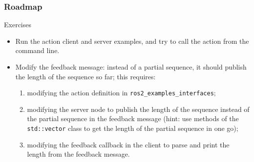 \documentclass[aspectratio=169]{beamer}
\begin{document}
\frame{\titlepage}



\begin{frame}
	\frametitle{Roadmap}
	\tableofcontents
\end{frame}







\begin{frame}{Exercises}
	\begin{itemize}
		\item Run the action client and server examples, and try to call the action from the command line.
		\item Modify the feedback message: instead of a partial sequence, it should publish the length of the sequence so far; this requires:
		      \begin{enumerate}
			      \item modifying the action definition in \texttt{ros2\_examples\_interfaces};
			      \item modifying the server node to publish the length of the sequence instead of the partial sequence in the feedback message (hint: use methods of the \texttt{std::vector} class to get the length of the partial sequence in one go);
			      \item modifying the feedback callback in the client to parse and print the length from the feedback message.
		      \end{enumerate}
	\end{itemize}
\end{frame}
\end{document}
